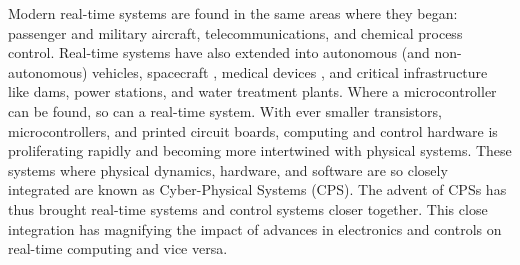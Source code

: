 Modern real-time systems are found in the same areas where they began: passenger and military aircraft, telecommunications, and chemical process control.
Real-time systems have also extended into autonomous (and non-autonomous) vehicles, spacecraft \cite{vavra_real-time_2018}, medical devices \cite{jiang_real-time_2010}, and critical infrastructure like dams, power stations, and water treatment plants.
Where a microcontroller can be found, so can a real-time system.
With ever smaller transistors, microcontrollers, and printed circuit boards, computing and control hardware is proliferating rapidly and becoming more intertwined with physical systems.
These systems where physical dynamics, hardware, and software are so closely integrated are known as Cyber-Physical Systems (CPS).
The advent of CPSs has thus brought real-time systems and control systems closer together.
This close integration has magnifying the impact of advances in electronics and controls on real-time computing and vice versa.

